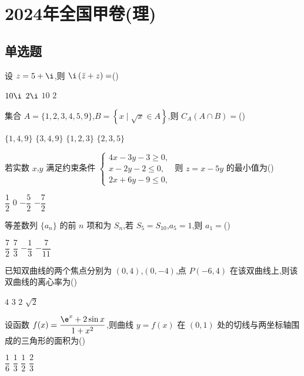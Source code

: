 \chapter{2024年全国甲卷(理)}

\section{单选题}

\begin{problem}
设 \( z=5+\i \),则 \( \i \left( \bar z+z \right)= \)(\quad)

\choices
    {\( 10\i \)}
    {\( 2\i \)}
    {\( 10 \)}
    {\( 2 \)}
\end{problem}

\begin{problem}
集合 \( A=\{1,2,3,4,5,9\} \),\( B=\left\{ x \mid \sqrt{x}\in A \right\} \),则 \( C_A\left( A\cap B \right)= \)(\quad)

\choices
    {\( \{1,4,9\} \)}
    {\( \{3,4,9\} \)}
    {\( \{1,2,3\} \)}
    {\( \{2,3,5\} \)}
\end{problem}

\begin{problem}
若实数 \(x\),\(y\) 满足约束条件
\(\begin{cases}
4x-3y-3\ge 0,\\
x-2y-2\le 0,\\
2x+6y-9\le 0,
\end{cases}\)
则 \( z=x-5y \) 的最小值为(\quad)

\choices
    {\( \dfrac{1}{2} \)}
    {\( 0 \)}
    {\( -\dfrac{5}{2} \)}
    {\( -\dfrac{7}{2} \)}
\end{problem}

\begin{problem}
等差数列 \( \{a_n\} \) 的前 \( n \) 项和为 \( S_n \),若 \( S_5=S_{10} \),\( a_5=1 \),则 \( a_1= \)(\quad)

\choices
    {\( \dfrac{7}{2} \)}
    {\( \dfrac{7}{3} \)}
    {\( -\dfrac{1}{3} \)}
    {\( -\dfrac{7}{11} \)}
\end{problem}

\begin{problem}
已知双曲线的两个焦点分别为 \( (0,4) \),\( (0,-4) \),点 \( P(-6,4) \) 在该双曲线上,则该双曲线的离心率为(\quad)

\choices
    {\( 4 \)}
    {\( 3 \)}
    {\( 2 \)}
    {\( \sqrt{2} \)}
\end{problem}

\begin{problem}
设函数 \( f(x)=\dfrac{\e^x+2\sin x}{1+x^2} \),则曲线 \( y=f(x) \) 在 \( (0,1) \) 处的切线与两坐标轴围成的三角形的面积为(\quad)

\choices
    {\( \dfrac{1}{6} \)}
    {\( \dfrac{1}{3} \)}
    {\( \dfrac{1}{2} \)}
    {\( \dfrac{2}{3} \)}
\end{problem}

